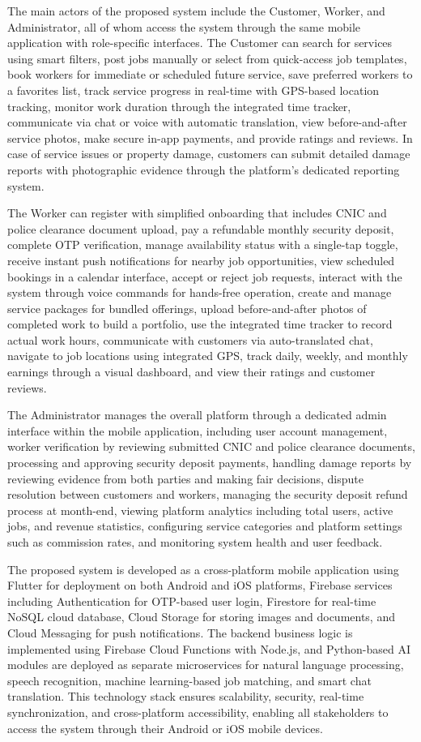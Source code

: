 \documentclass[12pt,a4paper]{report}
\begin{document}
The main actors of the proposed system include the Customer, Worker, and Administrator, all of whom access the system through the same mobile application with role-specific interfaces. The Customer can search for services using smart filters, post jobs manually or select from quick-access job templates, book workers for immediate or scheduled future service, save preferred workers to a favorites list, track service progress in real-time with GPS-based location tracking, monitor work duration through the integrated time tracker, communicate via chat or voice with automatic translation, view before-and-after service photos, make secure in-app payments, and provide ratings and reviews. In case of service issues or property damage, customers can submit detailed damage reports with photographic evidence through the platform's dedicated reporting system.

The Worker can register with simplified onboarding that includes CNIC and police clearance document upload, pay a refundable monthly security deposit, complete OTP verification, manage availability status with a single-tap toggle, receive instant push notifications for nearby job opportunities, view scheduled bookings in a calendar interface, accept or reject job requests, interact with the system through voice commands for hands-free operation, create and manage service packages for bundled offerings, upload before-and-after photos of completed work to build a portfolio, use the integrated time tracker to record actual work hours, communicate with customers via auto-translated chat, navigate to job locations using integrated GPS, track daily, weekly, and monthly earnings through a visual dashboard, and view their ratings and customer reviews.

The Administrator manages the overall platform through a dedicated admin interface within the mobile application, including user account management, worker verification by reviewing submitted CNIC and police clearance documents, processing and approving security deposit payments, handling damage reports by reviewing evidence from both parties and making fair decisions, dispute resolution between customers and workers, managing the security deposit refund process at month-end, viewing platform analytics including total users, active jobs, and revenue statistics, configuring service categories and platform settings such as commission rates, and monitoring system health and user feedback.

The proposed system is developed as a cross-platform mobile application using Flutter for deployment on both Android and iOS platforms, Firebase services including Authentication for OTP-based user login, Firestore for real-time NoSQL cloud database, Cloud Storage for storing images and documents, and Cloud Messaging for push notifications. The backend business logic is implemented using Firebase Cloud Functions with Node.js, and Python-based AI modules are deployed as separate microservices for natural language processing, speech recognition, machine learning-based job matching, and smart chat translation. This technology stack ensures scalability, security, real-time synchronization, and cross-platform accessibility, enabling all stakeholders to access the system through their Android or iOS mobile devices.
\end{document}
